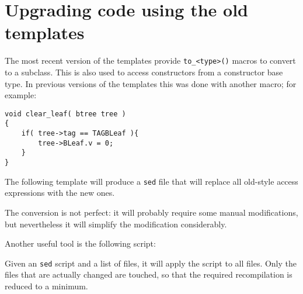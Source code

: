 \chapter{Upgrading code using the old {\C} templates}
\label{s.upgrade}
The most recent version of the {\Tm} templates provide
\verb'to_<type>()' macros to convert to a subclass. This is also
used to access constructors from a constructor base type.
In previous versions of the {\Tm} templates this was done with
another macro; for example:
\begin{showfile}
\begin{verbatim}
void clear_leaf( btree tree )
{
    if( tree->tag == TAGBLeaf ){
        tree->BLeaf.v = 0;
    }
}
\end{verbatim}
\end{showfile}
The following {\Tm} template will produce a {\tt sed} file that
will replace all old-style access expressions with the new ones.
\begin{showfile}
\end{showfile}
The conversion is not perfect: it will probably require some manual
modifications, but nevertheless it will simplify the modification
considerably.
\par
Another useful tool is the following script:
\begin{showfile}
\end{showfile}
Given an {\tt sed} script and a list of files, it will apply the
script to all files. Only the files that are actually changed are
touched, so that the required recompilation is reduced to a minimum.
